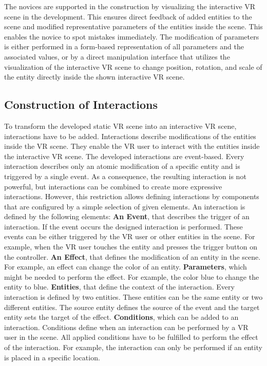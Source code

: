 \documentclass[conference]{IEEEtran}
\begin{document}
The novices are supported in the construction by visualizing the interactive VR scene in the development. This ensures direct feedback of added entities to the scene and modified representative parameters of the entities inside the scene. This enables the novice to spot mistakes immediately. The modification of parameters is either performed in a form-based representation of all parameters and the associated values, or by a direct manipulation interface that utilizes the visualization of the interactive VR scene to change position, rotation, and scale of the entity directly inside the shown interactive VR scene.    

\subsection{Construction of Interactions}
To transform the developed static VR scene into an interactive \ac{VR} scene, interactions have to be added. Interactions describe modifications of the entities inside the VR scene. They enable the VR user to interact with the entities inside the interactive VR scene. The developed interactions are event-based. Every interaction describes only an atomic modification of a specific entity and is triggered by a single event. As a consequence, the resulting interaction is not powerful, but interactions can be combined to create more expressive interactions. However, this restriction allows defining interactions by components that are configured by a simple selection of given elements. An interaction is defined by the following elements:
\textbf{An Event}, that describes the trigger of an interaction. If the event occurs the designed interaction is performed. These events can be either triggered by the \ac{VR} user or other entities in the scene. For example, when the \ac{VR} user touches the entity and presses the trigger button on the controller. 
\textbf{An Effect}, that defines the modification of an entity in the scene. For example, an effect can change the color of an entity.
\textbf{Parameters}, which might be needed to perform the effect. For example, the color blue to change the entity to blue.
\textbf{Entities}, that define the context of the interaction. Every interaction is defined by two entities. These entities can be the same entity or two different entities. The source entity defines the source of the event and the target entity sets the target of the effect.
\textbf{Conditions}, which can be added to an interaction. Conditions define when an interaction can be performed by a \ac{VR} user in the scene. All applied conditions have to be fulfilled to perform the effect of the interaction. For example, the interaction can only be performed if an entity is placed in a specific location.  
\end{document}
